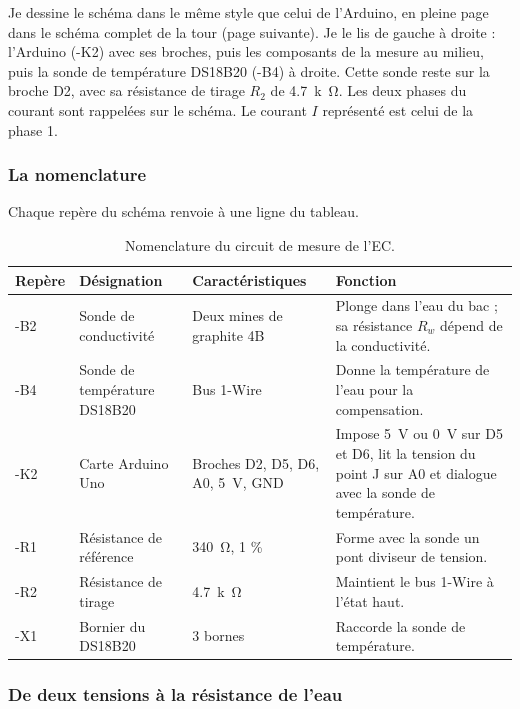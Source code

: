 Je dessine le schéma dans le même style que celui de l'Arduino, en pleine page dans le schéma complet de la tour (page suivante). Je le lis de gauche à droite : l'Arduino (-K2) avec ses broches, puis les composants de la mesure au milieu, puis la sonde de température DS18B20 (-B4) à droite. Cette sonde reste sur la broche D2, avec sa résistance de tirage $R_2$ de \qty{4,7}{k\ohm}. Les deux phases du courant sont rappelées sur le schéma. Le courant $I$ représenté est celui de la phase 1.


\subsubsection*{La nomenclature}

Chaque repère du schéma renvoie à une ligne du tableau.

\begin{table}[H]
\centering
\small
\begin{tabularx}{\textwidth}{|l|l|l|Y|}
\hline
\textbf{Repère} & \textbf{Désignation} & \textbf{Caractéristiques} & \textbf{Fonction} \\
\hline
-B2 & Sonde de conductivité & Deux mines de graphite 4B & Plonge dans l'eau du bac ; sa résistance $R_w$ dépend de la conductivité. \\
\hline
-B4 & Sonde de température DS18B20 & Bus 1-Wire & Donne la température de l'eau pour la compensation. \\
\hline
-K2 & Carte Arduino Uno & Broches D2, D5, D6, A0, \qty{5}{V}, GND & Impose \qty{5}{V} ou \qty{0}{V} sur D5 et D6, lit la tension du point J sur A0 et dialogue avec la sonde de température. \\
\hline
-R1 & Résistance de référence & \qty{340}{\ohm}, 1 \% & Forme avec la sonde un pont diviseur de tension. \\
\hline
-R2 & Résistance de tirage & \qty{4,7}{k\ohm} & Maintient le bus 1-Wire à l'état haut. \\
\hline
-X1 & Bornier du DS18B20 & 3 bornes & Raccorde la sonde de température. \\
\hline
\end{tabularx}
\caption{Nomenclature du circuit de mesure de l'EC.}
\end{table}

\subsubsection*{De deux tensions à la résistance de l'eau}

